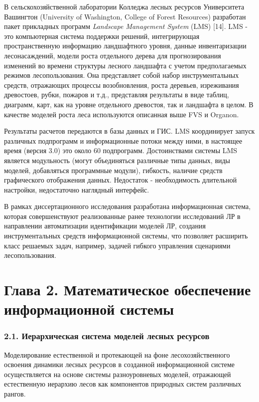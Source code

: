 \documentclass{article}
\begin{document}
В сельскохозяйственной лаборатории Колледжа 
лесных ресурсов Университета Вашингтон (University 
of Washington, College of Forest Resources) разработан пакет прикладных 
программ \textit{Landscape Management System} (LMS) [14]. LMS - это 
компьютерная система поддержки решений, интегрирующая 
пространственную информацию ландшафтного 
уровня, данные инвентаризации лесонасаждений, 
модели роста отдельного дерева для прогнозирования 
изменений во времени структуры лесного ландшафта 
с учетом предполагаемых режимов лесопользования. 
Она представляет собой набор инструментальных 
средств, отражающих процессы возобновления, 
роста деревьев, изреживания древостоев, рубки, 
пожаров и т.д., представляя результаты в виде 
таблиц, диаграмм, карт, как на уровне отдельного 
древостоя, так и ландшафта в целом. В качестве 
моделей роста леса используются описанная 
выше FVS и Organon.

Результаты расчетов передаются в базы данных 
и ГИС. LMS координирует запуск различных подпрограмм 
и информационные потоки между ними, в настоящее 
время (версия 3.0) это около 60 подпрограмм. Достоинствами 
системы LMS является модульность (могут объединяться 
различные типы данных, виды моделей, добавляться 
программные модули), гибкость, наличие средств 
графического отображения данных. Недостаток 
- необходимость длительной настройки, недостаточно 
наглядный интерфейс.

В рамках диссертационного исследования разработана 
информационная система, которая совершенствуют 
реализованные ранее технологии исследований 
ЛР в направлении автоматизации идентификации 
моделей ЛР, создания инструментальных средств 
информационной системы, что позволяет расширить 
класс решаемых задач, например, задачей гибкого 
управления сценариями лесопользования.\pagebreak{}\label{HToc128995776}\label{HToc199746719}

\section*{\textbf{Глава 2. Математическое обеспечение 
информационной системы\label{HToc199746720}}}

\subsubsection*{\textbf{2.1. Иерархическая система моделей 
лесных ресурсов }}

Моделирование естественной и протекающей на 
фоне лесохозяйственного освоения динамики 
лесных ресурсов в созданной информационной 
системе осуществляется на основе системы разноуровневых 
моделей, отражающей естественную иерархию 
лесов как компонентов природных систем различных 
рангов. 
\end{document}

